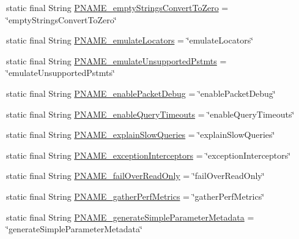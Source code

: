 \begin{DoxyCompactItemize}
\item 
static final String \mbox{\hyperlink{classcom_1_1mysql_1_1cj_1_1conf_1_1_property_definitions_a64c01544c9788c8869dafb7c1edce838}{P\+N\+A\+M\+E\+\_\+empty\+Strings\+Convert\+To\+Zero}} = \char`\"{}empty\+Strings\+Convert\+To\+Zero\char`\"{}
\item 
static final String \mbox{\hyperlink{classcom_1_1mysql_1_1cj_1_1conf_1_1_property_definitions_a36e27525977e55e511a03389cf044bfa}{P\+N\+A\+M\+E\+\_\+emulate\+Locators}} = \char`\"{}emulate\+Locators\char`\"{}
\item 
static final String \mbox{\hyperlink{classcom_1_1mysql_1_1cj_1_1conf_1_1_property_definitions_a129407d7ef935e704ca85ffb73eae8d4}{P\+N\+A\+M\+E\+\_\+emulate\+Unsupported\+Pstmts}} = \char`\"{}emulate\+Unsupported\+Pstmts\char`\"{}
\item 
static final String \mbox{\hyperlink{classcom_1_1mysql_1_1cj_1_1conf_1_1_property_definitions_aa65831137f93581e02976220f8e7a475}{P\+N\+A\+M\+E\+\_\+enable\+Packet\+Debug}} = \char`\"{}enable\+Packet\+Debug\char`\"{}
\item 
static final String \mbox{\hyperlink{classcom_1_1mysql_1_1cj_1_1conf_1_1_property_definitions_a3d5d4f25f4470a5c87e6b71f66eafe41}{P\+N\+A\+M\+E\+\_\+enable\+Query\+Timeouts}} = \char`\"{}enable\+Query\+Timeouts\char`\"{}
\item 
static final String \mbox{\hyperlink{classcom_1_1mysql_1_1cj_1_1conf_1_1_property_definitions_a5fd4030a62e52b3fd004776285005461}{P\+N\+A\+M\+E\+\_\+explain\+Slow\+Queries}} = \char`\"{}explain\+Slow\+Queries\char`\"{}
\item 
static final String \mbox{\hyperlink{classcom_1_1mysql_1_1cj_1_1conf_1_1_property_definitions_ad1c96903e78b9e4773c0639a1014fa02}{P\+N\+A\+M\+E\+\_\+exception\+Interceptors}} = \char`\"{}exception\+Interceptors\char`\"{}
\item 
static final String \mbox{\hyperlink{classcom_1_1mysql_1_1cj_1_1conf_1_1_property_definitions_a872c34a5c87af41a012c02851d96e004}{P\+N\+A\+M\+E\+\_\+fail\+Over\+Read\+Only}} = \char`\"{}fail\+Over\+Read\+Only\char`\"{}
\item 
static final String \mbox{\hyperlink{classcom_1_1mysql_1_1cj_1_1conf_1_1_property_definitions_a8232725f9f43b860f4894e49367ec28d}{P\+N\+A\+M\+E\+\_\+gather\+Perf\+Metrics}} = \char`\"{}gather\+Perf\+Metrics\char`\"{}
\item 
static final String \mbox{\hyperlink{classcom_1_1mysql_1_1cj_1_1conf_1_1_property_definitions_a0d0d98c71d9b07610fa02e4402faa552}{P\+N\+A\+M\+E\+\_\+generate\+Simple\+Parameter\+Metadata}} = \char`\"{}generate\+Simple\+Parameter\+Metadata\char`\"{}

\end{DoxyCompactItemize}
